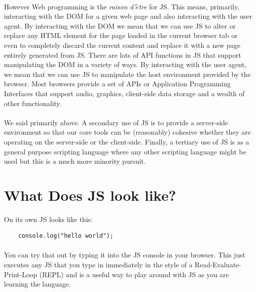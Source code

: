 \paragraph{} However Web programming is the \emph{raison d'$\hat{e}$tre} for JS. This means, primarily, interacting with the DOM for a given web page and also interacting with the user agent. By interacting with the DOM we mean that we can use JS to alter or replace any HTML element for the page loaded in the current browser tab or even to completely discard the current content and replace it with a new page entirely generated from JS. There are lots of API functions in JS that support manipulating the DOM in a variety of ways. By interacting with the user agent, we mean that we can use JS to manipulate the host environment provided by the browser. Most browsers provide a set of APIs or Application Programming Interfaces that support audio, graphics, client-side data storage and a wealth of other functionality.
\paragraph{} We said primarily above. A secondary use of JS is to provide a server-side environment so that our core tools can be (reasonably) cohesive whether they are operating on the server-side or the client-side. Finally, a tertiary use of JS is as a general purpose scripting language where any other scripting language might be used but this is a much more minority pursuit.



\section{What Does JS look like?}
\paragraph{} On its own JS looks like this:

\begin{lstlisting}
	console.log("hello world");
\end{lstlisting}

\paragraph{} You can try that out by typing it into the JS console in your browser. This just executes any JS that you type in immediately in the style of a Read-Evaluate-Print-Loop (REPL) and is a useful way to play around with JS as you are learning the language.

